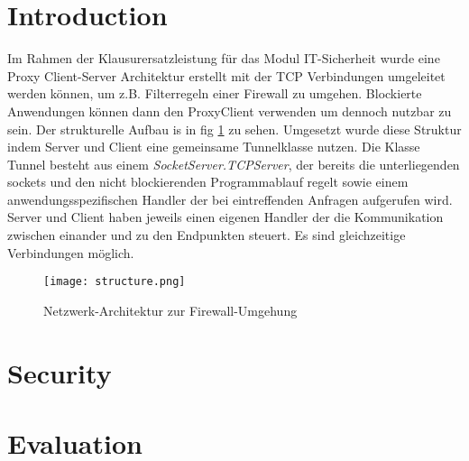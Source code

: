 \documentclass[12pt, a4paper]{scrartcl}
\begin{document}


\tableofcontents
\newpage
{}
\setcounter{lastroman}{\value{page}}

\pagestyle{plain}
\maketitle

\section{Introduction}
Im Rahmen der Klausurersatzleistung für das Modul IT-Sicherheit wurde eine Proxy Client-Server Architektur erstellt mit der TCP Verbindungen umgeleitet werden können, um z.B. Filterregeln einer Firewall zu umgehen. Blockierte Anwendungen können dann den ProxyClient verwenden um dennoch nutzbar zu sein. Der strukturelle Aufbau is in fig \ref{fig::arch} zu sehen.\newline
Umgesetzt wurde diese Struktur indem Server und Client eine gemeinsame Tunnelklasse nutzen. Die Klasse Tunnel besteht aus einem \textit{SocketServer.TCPServer}, der bereits die unterliegenden sockets und den nicht blockierenden Programmablauf regelt sowie einem anwendungsspezifischen Handler der bei eintreffenden Anfragen aufgerufen wird. Server und Client haben jeweils einen eigenen Handler der die Kommunikation zwischen einander und zu den Endpunkten steuert. Es sind gleichzeitige Verbindungen möglich.

\begin{figure}[H]
    \centering
    \texttt{[image: structure.png]}
    \caption{Netzwerk-Architektur zur Firewall-Umgehung}
    \label{fig::arch}
\end{figure}

\section{Security}
\section{Evaluation}
\end{document}

